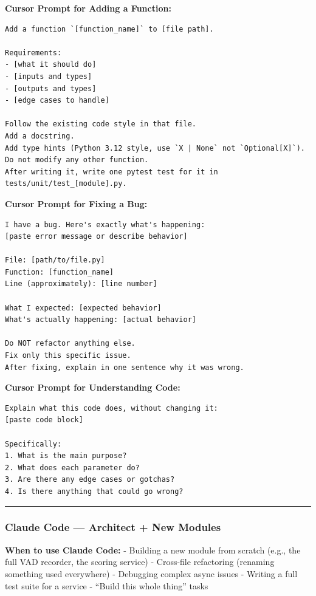 \documentclass[
  11pt,
]{article}
\begin{document}
\textbf{Cursor Prompt for Adding a Function:}

\begin{lstlisting}
Add a function `[function_name]` to [file path].

Requirements:
- [what it should do]
- [inputs and types]
- [outputs and types]
- [edge cases to handle]

Follow the existing code style in that file.
Add a docstring.
Add type hints (Python 3.12 style, use `X | None` not `Optional[X]`).
Do not modify any other function.
After writing it, write one pytest test for it in tests/unit/test_[module].py.
\end{lstlisting}

\textbf{Cursor Prompt for Fixing a Bug:}

\begin{lstlisting}
I have a bug. Here's exactly what's happening:
[paste error message or describe behavior]

File: [path/to/file.py]
Function: [function_name]
Line (approximately): [line number]

What I expected: [expected behavior]
What's actually happening: [actual behavior]

Do NOT refactor anything else.
Fix only this specific issue.
After fixing, explain in one sentence why it was wrong.
\end{lstlisting}

\textbf{Cursor Prompt for Understanding Code:}

\begin{lstlisting}
Explain what this code does, without changing it:
[paste code block]

Specifically:
1. What is the main purpose?
2. What does each parameter do?
3. Are there any edge cases or gotchas?
4. Is there anything that could go wrong?
\end{lstlisting}

\begin{center}\rule{0.5\linewidth}{0.5pt}\end{center}

\hypertarget{claude-code-architect-new-modules}{%
\subsubsection{Claude Code --- Architect + New
Modules}\label{claude-code-architect-new-modules}}

\textbf{When to use Claude Code:} - Building a new module from scratch
(e.g., the full VAD recorder, the scoring service) - Cross-file
refactoring (renaming something used everywhere) - Debugging complex
async issues - Writing a full test suite for a service - ``Build this
whole thing'' tasks
\end{document}
